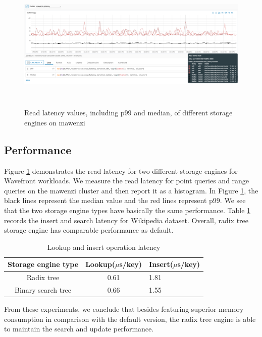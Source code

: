 \documentclass[sigplan,screen,nonacm]{acmart}
\begin{document}
\begin{figure}[t]
  \centering
  \includegraphics[width=\linewidth, height=6.5cm]{pic/read latency.png}
  \setlength{\belowcaptionskip}{-8pt} 
  \caption{Read latency values, including p99 and median, of different storage engines on mawenzi}
  \label{fig:read-latency}
\end{figure}

\subsection{Performance}
Figure \ref{fig:read-latency} demonstrates the read latency for two different storage engines for Wavefront workloads. We measure the read latency for point queries and range queries on the mawenzi cluster and then report it as a histogram. In Figure \ref{fig:read-latency}, the black lines represent the median value and the red lines represent p99.  We see that the two storage engine types have basically the same performance. Table \ref{tab:wiki-latency} records the insert and search latency for Wikipedia dataset. Overall, radix tree storage engine has comparable performance as default. 

\begin{table}[h]
  \caption{Lookup and insert operation latency}
  \begin{tabular}{ccl}
    \toprule
    Storage engine type&Lookup($\mu$s/key)&Insert($\mu$s/key)\\
    \midrule
    Radix tree & 0.61 & 1.81\\
    Binary search tree & 0.66 & 1.55\\
    \bottomrule
  \end{tabular}
  \label{tab:wiki-latency}
\end{table}

From these experiments, we conclude that besides featuring superior memory consumption in comparison with the default version, the radix tree engine is able to maintain the search and update performance. 
\end{document}
